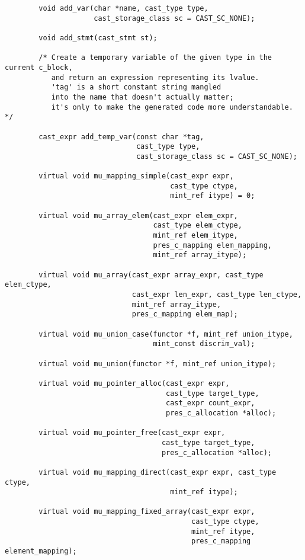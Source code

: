 \begin{verbatim}
        void add_var(char *name, cast_type type,
                     cast_storage_class sc = CAST_SC_NONE);

        void add_stmt(cast_stmt st);

        /* Create a temporary variable of the given type in the current c_block,
           and return an expression representing its lvalue.
           'tag' is a short constant string mangled
           into the name that doesn't actually matter;
           it's only to make the generated code more understandable.  */

        cast_expr add_temp_var(const char *tag,
                               cast_type type,
                               cast_storage_class sc = CAST_SC_NONE);

        virtual void mu_mapping_simple(cast_expr expr,
                                       cast_type ctype,
                                       mint_ref itype) = 0;

        virtual void mu_array_elem(cast_expr elem_expr,
                                   cast_type elem_ctype,
                                   mint_ref elem_itype,
                                   pres_c_mapping elem_mapping,
                                   mint_ref array_itype);

        virtual void mu_array(cast_expr array_expr, cast_type elem_ctype,
                              cast_expr len_expr, cast_type len_ctype,
                              mint_ref array_itype,
                              pres_c_mapping elem_map);

        virtual void mu_union_case(functor *f, mint_ref union_itype,
                                   mint_const discrim_val);

        virtual void mu_union(functor *f, mint_ref union_itype);

        virtual void mu_pointer_alloc(cast_expr expr,
                                      cast_type target_type,
                                      cast_expr count_expr,
                                      pres_c_allocation *alloc);

        virtual void mu_pointer_free(cast_expr expr,
                                     cast_type target_type,
                                     pres_c_allocation *alloc);

        virtual void mu_mapping_direct(cast_expr expr, cast_type ctype,
                                       mint_ref itype);

        virtual void mu_mapping_fixed_array(cast_expr expr,
                                            cast_type ctype,
                                            mint_ref itype,
                                            pres_c_mapping element_mapping);


\end{verbatim}

